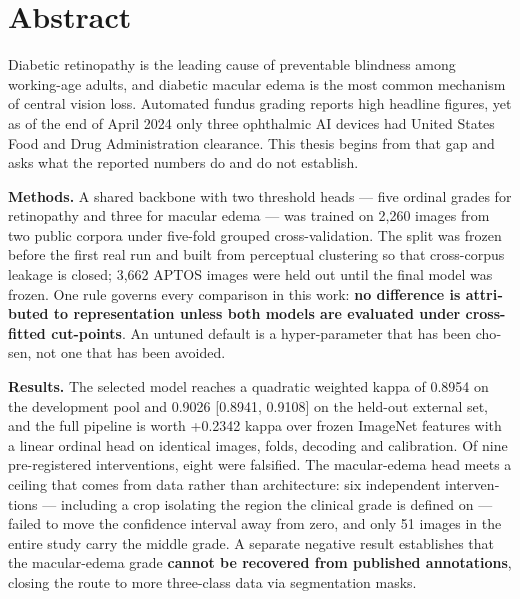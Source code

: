 
\chapter*{Abstract}
\begin{latin}
\noindent
Diabetic retinopathy is the leading cause of preventable blindness among working-age adults, and
diabetic macular edema is the most common mechanism of central vision loss. Automated fundus
grading reports high headline figures, yet as of the end of April 2024 only three ophthalmic AI
devices had United States Food and Drug Administration clearance. This thesis begins from that
gap and asks what the reported numbers do and do not establish.

\vspace{0.6em}
\noindent\textbf{Methods.} A shared backbone with two threshold heads --- five ordinal grades for
retinopathy and three for macular edema --- was trained on 2{,}260 images from two public corpora
under five-fold grouped cross-validation. The split was frozen before the first real run and
built from perceptual clustering so that cross-corpus leakage is closed; 3{,}662 APTOS images were
held out until the final model was frozen. One rule governs every comparison in this work:
\textbf{no difference is attributed to representation unless both models are evaluated under
cross-fitted cut-points}. An untuned default is a hyper-parameter that has been chosen, not one
that has been avoided.

\vspace{0.6em}
\noindent\textbf{Results.} The selected model reaches a quadratic weighted kappa of 0.8954 on the
development pool and 0.9026 [0.8941, 0.9108] on the held-out external set, and the full pipeline
is worth +0.2342 kappa over frozen ImageNet features with a linear ordinal head on identical
images, folds, decoding and calibration. Of nine pre-registered interventions, eight were
falsified. The macular-edema head meets a ceiling that comes from data rather than architecture:
six independent interventions --- including a crop isolating the region the clinical grade is
defined on --- failed to move the confidence interval away from zero, and only 51 images in the
entire study carry the middle grade. A separate negative result establishes that the macular-edema
grade \textbf{cannot be recovered from published annotations}, closing the route to more
three-class data via segmentation masks.


\end{latin}
